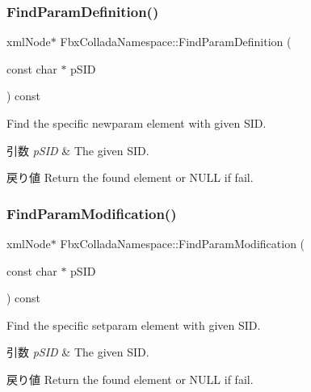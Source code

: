 \subsubsection{\texorpdfstring{Find\+Param\+Definition()}{FindParamDefinition()}}
{\footnotesize\ttfamily xml\+Node$\ast$ Fbx\+Collada\+Namespace\+::\+Find\+Param\+Definition (\begin{DoxyParamCaption}\item[{const char $\ast$}]{p\+S\+ID }\end{DoxyParamCaption}) const}

Find the specific newparam element with given S\+ID. 
\begin{DoxyParams}{引数}
{\em p\+S\+ID} & The given S\+ID. \\
\hline
\end{DoxyParams}
\begin{DoxyReturn}{戻り値}
Return the found element or N\+U\+LL if fail. 
\end{DoxyReturn}
\mbox{\label{struct_fbx_collada_namespace_a6061a9a88eecad58d7909ac84d7c0e73}} 
\subsubsection{\texorpdfstring{Find\+Param\+Modification()}{FindParamModification()}}
{\footnotesize\ttfamily xml\+Node$\ast$ Fbx\+Collada\+Namespace\+::\+Find\+Param\+Modification (\begin{DoxyParamCaption}\item[{const char $\ast$}]{p\+S\+ID }\end{DoxyParamCaption}) const}

Find the specific setparam element with given S\+ID. 
\begin{DoxyParams}{引数}
{\em p\+S\+ID} & The given S\+ID. \\
\hline
\end{DoxyParams}
\begin{DoxyReturn}{戻り値}
Return the found element or N\+U\+LL if fail. 
\end{DoxyReturn}
\mbox{\label{struct_fbx_collada_namespace_a5bf3b2e91505df6ef9621e79349a14d7}} 
